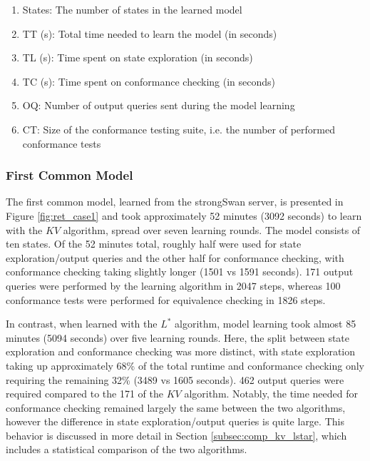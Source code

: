 \begin{enumerate}
	\item States: The number of states in the learned model
	\item TT (s): Total time needed to learn the model (in seconds)
	\item TL (s): Time spent on state exploration (in seconds)
	\item TC (s): Time spent on conformance checking (in seconds)
	\item OQ: Number of output queries sent during the model learning
	\item CT: Size of the conformance testing suite, i.e. the number of performed conformance tests
\end{enumerate}
 

\subsubsection*{First Common Model}

The first common model, learned from the strongSwan server, is presented in Figure \ref{fig:ret_case1} and took approximately 52 minutes (3092 seconds) to learn with the $KV$ algorithm, spread over seven learning rounds. The model consists of ten states. Of the 52 minutes total, roughly half were used for state exploration/output queries and the other half for conformance checking, with conformance checking taking slightly longer (1501 vs 1591 seconds). 171 output queries were performed by the learning algorithm in 2047 steps, whereas 100 conformance tests were performed for equivalence checking in 1826 steps.

In contrast, when learned with the $L^*$ algorithm, model learning took almost 85 minutes (5094 seconds) over five learning rounds. Here, the split between state exploration and conformance checking was more distinct, with state exploration taking up approximately 68\% of the total runtime and conformance checking only requiring the remaining 32\% (3489 vs 1605 seconds). 462 output queries were required compared to the 171 of the $KV$ algorithm. Notably, the time needed for conformance checking remained largely the same between the two algorithms, however the difference in state exploration/output queries is quite large. This behavior is discussed in more detail in Section \ref{subsec:comp_kv_lstar}, which includes a statistical comparison of the two algorithms.


